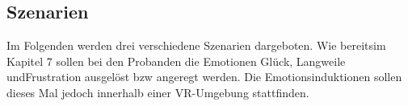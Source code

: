 \subsection{Szenarien} \label{szenarien-subsec}


Im Folgenden werden drei verschiedene Szenarien dargeboten. 
Wie bereitsim Kapitel 7 sollen bei den Probanden die Emotionen Gl{\"u}ck, Langweile undFrustration ausgel{\"o}st bzw angeregt werden. 
Die Emotionsinduktionen sollen dieses Mal jedoch innerhalb einer VR-Umgebung stattfinden.







